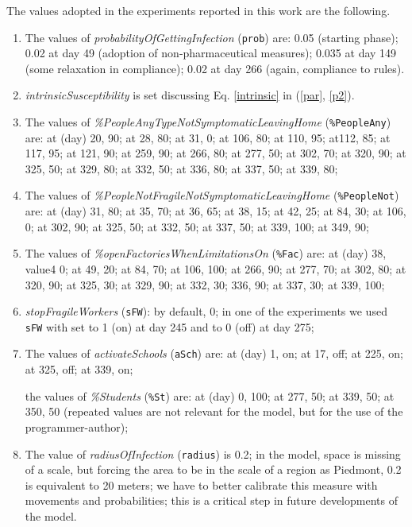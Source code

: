 \documentclass[graybox]{svmult}
\begin{document}
The values adopted in the experiments reported in this work are the following.

\begin{enumerate}[label=\roman*]

\item \label{pp1} The values of \emph{probabilityOfGettingInfection} (\verb|prob|) are: 0.05 (starting phase); 0.02 at day 49 (adoption of non-pharmaceutical measures); 0.035 at day 149 (some relaxation in compliance); 0.02 at day 266 (again, compliance to rules).  

\item \label{pp2} \emph{intrinsicSusceptibility} is set discussing Eq. \ref{intrinsic} in (\ref{par}, \ref{p2}).

\item \label{pp3} The values of \emph{\%PeopleAnyTypeNotSymptomaticLeavingHome} (\verb|%PeopleAny|) are:
at (day) 20, 90; at 28, 80; at 31, 0; at 106, 80; at 110, 95; at112, 85; at 117, 95; at 121, 90; at 259, 90; at 266, 80; at 277, 50;
at 302, 70; at 320, 90; at 325, 50; at 329, 80; at 332, 50; at 336, 80; at 337, 50; at 339, 80; 

\item \label{pp4} The values of \emph{\%PeopleNotFragileNotSymptomaticLeavingHome} (\verb|%PeopleNot|) are:
at (day) 31, 80; at 35, 70; at 36, 65; at 38, 15; at 42, 25; at 84, 30; at 106, 0; at 302, 90; at 325, 50; at 332, 50; 
at 337, 50; at 339, 100; at 349, 90;

\item \label{pp5} The values of \emph{\%openFactoriesWhenLimitationsOn} (\verb|%Fac|) are:
at (day) 38, value4 0; at 49, 20; at 84, 70; at 106, 100; at 266, 90; at 277, 70; at 302, 80; at 320, 90; at 325, 30;
at 329, 90; at 332, 30; 336, 90; at 337, 30; at 339, 100;

\item \label{pp6} \emph{stopFragileWorkers}  (\verb|sFW|): by default, 0; in one of the experiments we used \verb|sFW| with set to 1 (on) at day 245  and to 0 (off) at day 275;

\item \label{pp7} The values of \emph{activateSchools} (\verb|aSch|) are:
at (day) 1, on; at 17, off; at 225, on; at 325, off; at 339, on; 

the values of  \emph{\%Students} (\verb|%St|) are: 
at (day) 0, 100; at 277, 50; at 339, 50; at 350, 50 (repeated values are not relevant for the model, but for the use of the programmer-author);

\item \label{pp8} The value of \emph{radiusOfInfection} (\verb|radius|) is 0.2; in the model, space is missing of a scale, but forcing the area to be in the scale of a region as Piedmont, 0.2 is equivalent to 20 meters; we have to better calibrate this measure with movements and probabilities; this is a critical step in future developments of the model.

\end{enumerate}
\end{document}
